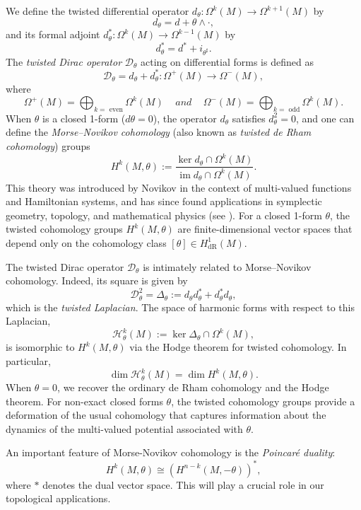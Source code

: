 \documentclass[12pt, twoside]{article}
\theoremstyle{definition}
\numberwithin{equation}{section}
\begin{document}
	We define the twisted differential operator 
	\(d_{\theta}:\Omega^{k}(M)\to\Omega^{k+1}(M)\) by
	\[
	d_{\theta}=d+\theta\wedge\cdot,
	\]
	and its formal adjoint 
	\(d^{*}_{\theta}:\Omega^{k}(M)\to\Omega^{k-1}(M)\) by
	\[
	d^{*}_{\theta}=d^{*}+i_{\theta^{\sharp}} .
	\]
	The \emph{twisted Dirac operator} \(\mathcal{D}_{\theta}\) acting on differential forms is defined as
	\[
	\mathcal{D}_{\theta}=d_{\theta}+d^{*}_{\theta}:\Omega^{+}(M)\to\Omega^{-}(M),
	\]
	where 
	\[\Omega^{+}(M)=\bigoplus_{k=\text{ even}}\Omega^{k}(M)\,\quad and\,\quad
	\Omega^{-}(M)=\bigoplus_{k=\text{ odd}}\Omega^{k}(M).\]
	When \(\theta\) is a closed 1-form (\(d\theta=0\)), the operator \(d_{\theta}\) satisfies \(d_{\theta}^2=0\), 
	and one can define the \emph{Morse--Novikov cohomology} (also known as \emph{twisted de Rham cohomology}) groups
	\[
	H^k(M,\theta):=\frac{\ker d_{\theta}\cap\Omega^k(M)}{\operatorname{im}d_{\theta}\cap\Omega^k(M)}.
	\]
	This theory was introduced by Novikov \cite{Novikov1982} in the context of multi-valued functions and Hamiltonian systems, and has since found applications in symplectic geometry, topology, and mathematical physics (see \cite{deLeon2003}). For a closed 1-form \(\theta\), the twisted cohomology groups \(H^k(M,\theta)\) are finite-dimensional vector spaces that depend only on the cohomology class \([\theta]\in H^1_{\text{dR}}(M)\).
	
	The twisted Dirac operator \(\mathcal{D}_{\theta}\) is intimately related to Morse--Novikov cohomology. Indeed, its square is given by
	\[
	\mathcal{D}_{\theta}^2 = \Delta_{\theta} := d_{\theta}d_{\theta}^{*}+d_{\theta}^{*}d_{\theta},
	\]
	which is the \emph{twisted Laplacian}. The space of harmonic forms with respect to this Laplacian,
	\[
	\mathcal{H}^k_{\theta}(M):=\ker\Delta_{\theta}\cap\Omega^k(M),
	\]
	is isomorphic to \(H^k(M,\theta)\) via the Hodge theorem for twisted cohomology. In particular,
	\[
	\dim\mathcal{H}^k_{\theta}(M)=\dim H^k(M,\theta).
	\]
	When \(\theta=0\), we recover the ordinary de Rham cohomology and the Hodge theorem. For non-exact closed forms \(\theta\), the twisted cohomology groups provide a deformation of the usual cohomology that captures information about the dynamics of the multi-valued potential associated with \(\theta\).
	
	An important feature of Morse-Novikov cohomology is the \emph{Poincar\'e duality}:
	\[
	H^k(M,\theta)\cong (H^{n-k}(M,-\theta))^*,
	\]
	where \(*\) denotes the dual vector space. This will play a crucial role in our topological applications.
	
\end{document}
